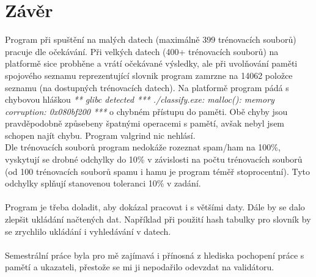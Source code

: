 \documentclass[12pt, a4paper]{report}
\begin{document}
\chapter{Závěr}
Program při spuštění na malých datech (maximálně 399 trénovacích souborů) pracuje dle očekávání. Při velkých datech (400+ trénovacích souborů) na platformě  sice probhěne a vrátí očekávané výsledky, ale při uvolňování paměti spojového seznamu reprezentující slovnik program zamrzne na 14062 položce seznamu (na dostupných trénovacích datech). Na platformě  program pádá s chybovou hláškou {\it *** glibc detected *** ./classify.exe: malloc(): memory corruption: 0x080bf200 ***}  o chybném přístupu do paměti. Obě chyby jsou pravděpodobně způsebeny špatnými operacemi s pamětí, avšak nebyl jsem schopen najít chybu. Program valgrind nic nehlásí.\\
Dle trénovacích souborů program nedokáže rozeznat spam/ham na 100\%, vyskytují se drobné odchylky do 10\% v závislosti na počtu trénovacích souborů (od 100 trénovacích souborů spamu i hamu je program téměř stoprocentní). Tyto odchylky splňují stanovenou toleranci 10\% v zadání.\\
\\
Program je třeba doladit, aby dokázal pracovat i s většími daty. Dále by se dalo zlepšit ukládání načtených dat. Například při použití hash tabulky pro slovník by se zrychlilo ukládání i vyhledávání v datech.\\
\\
Semestrální práce byla pro mě zajímavá i přínosná z hlediska pochopení práce s pamětí a ukazateli, přestože se mi ji nepodařilo odevzdat na validátoru.

\end{document}
